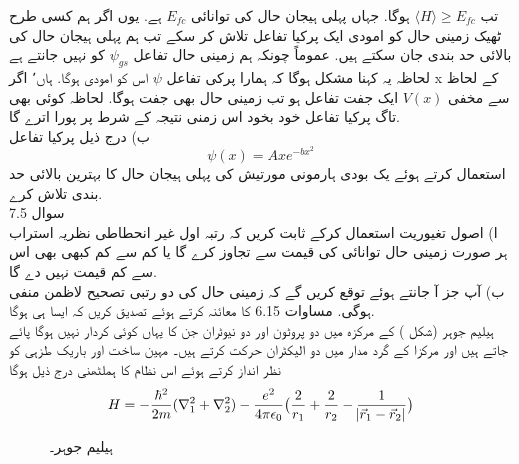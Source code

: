 تب
\(\langle H \rangle \ge E_{fc}\)
ہوگا. جہاں پہلی ہیجان حال کی توانائی
 \(E_{fc}\)
 ہے. یوں اگر ہم کسی طرح ٹھیک زمینی حال کو امودی ایک پرکیا تفاعل تلاش كر سکے تب ہم پہلی ہیجان حال کی بالائی حد بندی جان سکتے ہیں. عموماً چونکہ ہم زمینی حال تفاعل
 \(\psi_{gs}\)
 کو نہیں جانتے ہے لحاظہ یہ کہنا مشکل ہوگا کہ ہمارا پرکی تفاعل 
 \(\psi\)
  اس کو امودی ہوگا. ہاں٬ اگر x کے لحاظ سے مخفی
 \(V(x)\)
   ایک جفت تفاعل ہو تب زمینی حال بھی جفت ہوگا. لحاظہ کوئی بھی تاگ پرکیا تفاعل خود بخود اس زمنی نتیجہ کے شرط پر پورا اترے گا.\\
ب) درج ذیل پرکیا تفاعل
\[\psi(x)=Axe^{-bx^{2}}\]
استعمال کرتے ہوئے یک بودی ہارمونی مورتیش کی پہلی ہیجان حال کا بہترین بالائی حد بندی تلاش كرے.\\
سوال 7.5    \\
ا) اصول تغيوریت استعمال کرکے ثابت کریں کہ رتبہ اول غير انحطاطی نظریہ استراب ہر صورت زمینی حال توانائی کی قیمت سے تجاوز کرے گا يا كم سے كم کبھی بھی اس سے كم قیمت نہیں دے گا.\\
ب) آپ جز آ جانتے ہوئے توقع کریں گے کہ زمینی حال کی دو رتبی تصحیح لاظمن منفی ہوگی. مساوات 6.15 کا معائنہ كرتے ہوئے تصدیق كريں کہ ایسا ہی ہوگا. \\

ہیلیم جوہر  (شکل ) کے مرکزہ میں دو پروٹون اور دو نیوٹران جن کا یہاں کوئی کردار نہیں ہوگا پائے جاتے ہیں اور مرکزا کے گرد مدار میں دو الیکٹران حرکت کرتے ہیں۔
مہین ساخت اور باریک طزہی کو نظر انداز کرتے ہوئے اس نظام کا ہملٹھنی درج ذیل ہوگا 
\[H=-\frac{\hbar^{2}}{2m}(\nabla_{1}^{2}+\nabla_{2}^{2})-\frac{e^{2}}{4\pi\epsilon_{0}}\big (\frac{2}{r_{1}}+\frac{2}{r_{2}}-\frac{1}{\abs{\vec{r}_{1}-\vec{r}_{2}}}\big )\]

\begin{figure}
\centering
{}
\caption{ہیلیم جوہر۔}
\label{شکل_تغیریت_ہیلیم_جوہر}
\end{figure}


